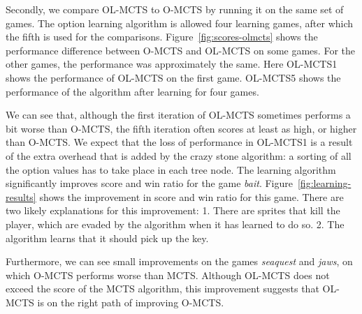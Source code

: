 Secondly, we compare OL-MCTS to O-MCTS by running it on the same set of games.
The option learning algorithm is allowed four learning games, after which the
fifth is used for the comparisons. Figure~\ref{fig:scores-olmcts} shows the
performance difference between O-MCTS and OL-MCTS on some games. For the other
games, the performance was approximately the same. Here OL-MCTS1 shows the
performance of OL-MCTS on the first game. OL-MCTS5 shows the performance of the
algorithm after learning for four games. 

We can see that, although the first iteration of OL-MCTS sometimes performs a
bit worse than O-MCTS, the fifth iteration often scores at least as high, or
higher than O-MCTS\@. We expect that the loss of performance in OL-MCTS1 is
a result of the extra overhead that is added by the crazy stone algorithm: a
sorting of all the option values has to take place in each tree node. The
learning algorithm significantly improves score and win ratio for the game
\textit{bait}.
Figure~\ref{fig:learning-results} shows the improvement in score and win ratio
for this game. There are two likely explanations for this improvement: 1. There
are sprites that kill the player, which are evaded by the algorithm when it has
learned to do so.  2. The algorithm learns that it should pick up the key.

Furthermore, we can see small improvements on the games \textit{seaquest} and
\textit{jaws}, on which O-MCTS performs worse than MCTS\@.  Although OL-MCTS
does not exceed the score of the MCTS algorithm, this improvement suggests
that OL-MCTS is on the right path of improving O-MCTS\@.

